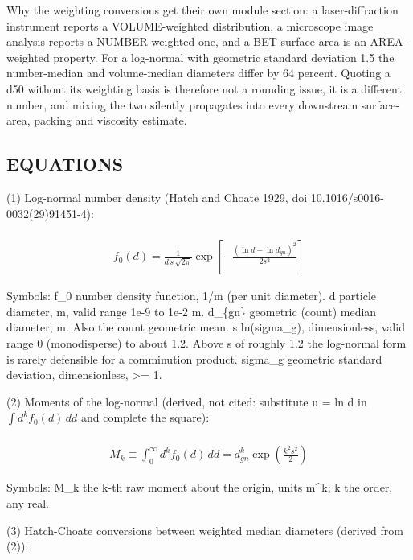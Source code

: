 \documentclass[10pt,a4paper,twoside]{report}
\begin{document}
Why the weighting conversions get their own module section: a laser-diffraction instrument reports a VOLUME-weighted distribution, a microscope image analysis reports a NUMBER-weighted one, and a BET surface area is an AREA-weighted property. For a log-normal with geometric standard deviation 1.5 the number-median and volume-median diameters differ by 64 percent. Quoting a d50 without its weighting basis is therefore not a rounding issue, it is a different number, and mixing the two silently propagates into every downstream surface-area, packing and viscosity estimate.

\subsection*{EQUATIONS}

(1) Log-normal number density (Hatch and Choate 1929, doi 10.1016/s0016-0032(29)91451-4):

\begin{equation*}
\begin{gathered}
\\ f_0(d) = \frac{1}{d\,s\,\sqrt{2\pi}} \exp\left[-\frac{(\ln d - \ln d_{gn})^2}{2 s^2}\right]
\end{gathered}
\end{equation*}

Symbols: f\_0       number density function, 1/m (per unit diameter). d         particle diameter, m, valid range 1e-9 to 1e-2 m. d\_\{gn\}    geometric (count) median diameter, m. Also the count geometric mean. s         ln(sigma\_g), dimensionless, valid range 0 (monodisperse) to about 1.2. Above s of roughly 1.2 the log-normal form is rarely defensible for a comminution product. sigma\_g   geometric standard deviation, dimensionless, >= 1.

(2) Moments of the log-normal (derived, not cited: substitute u = ln d in $\int d^k f_0(d)\,dd$ and complete the square):

\begin{equation*}
\begin{gathered}
\\ M_k \equiv \int_0^\infty d^k f_0(d)\,dd = d_{gn}^k \exp\!\left(\frac{k^2 s^2}{2}\right)
\end{gathered}
\end{equation*}

Symbols: M\_k the k-th raw moment about the origin, units m\textasciicircum{}k; k the order, any real.

(3) Hatch-Choate conversions between weighted median diameters (derived from (2)):
\end{document}
